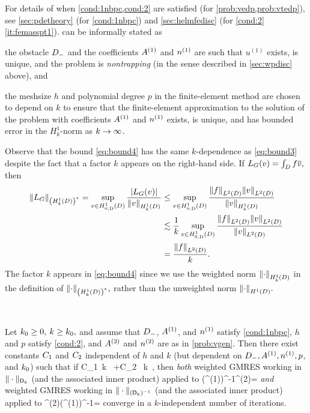 For details of when \cref{cond:1nbpc,cond:2} are satisfied (for \cref{prob:vedp,prob:vtedp}), see \cref{sec:pdetheory} (for \cref{cond:1nbpc}) and \cref{sec:helmfedisc} (for \cref{cond:2} \cref{it:femasspt1}).  can be informally stated as 
\bit
\item the obstacle $D_{-}$ and the coefficients ${A}^{(1)}$ and ${n}^{(1)}$ are such that $u^{(1)}$ exists, is unique, and the problem is \emph{nontrapping} (in the sense described in  \cref{sec:wpdisc} above), and
\item the meshsize $h$ and polynomial degree $p$ in the finite-element method are chosen to depend on $k$ to ensure that the 
finite-element approximation to the solution of the problem with coefficients ${A}^{(1)}$ and ${n}^{(1)}$ exists, is unique, and has bounded error in the $H^1_k$-norm as
$k\rightarrow \infty$. 
\eit 


\label{rem:yesitis}
Observe that the bound \cref{eq:bound4} has the same $k$-dependence as \cref{eq:bound3} despite the fact that a factor $k$ appears on the right-hand side. If $L_{G}(v) = \int_{D} f\overline{v},$ then
\begin{align*}
  \NHokDs{\LG} = \sup_{v \in \HozDD} \frac{\abs{\LG(v)}}{\NHokD{v}} &\leq\sup_{v \in \HozDD} \frac{\NLtD{f}\NLtD{v}}{\NHokD{v}}\\
  &\lesssim \frac1k \sup_{v \in \HozDD} \frac{\NLtD{f}\NLtD{v}}{\NLtD{v}}\\
  &= \frac{\NLtD{f}}k.
\end{align*}
The factor $k$ appears in \cref{eq:bound4} since we use the weighted norm $\NHokD{\cdot}$ in the definition of $\NHokDs{\cdot},$ rather than the unweighted norm $\NHoD{\cdot}.$
\ere

\label{cor:1}

\

\noindent Let $k_{0} \geq 0,$ $k \geq k_{0},$ and assume that $D_{-}$, ${A}^{(1)}$, and ${n}^{(1)}$ satisfy \cref{cond:1nbpc}, $h$ and $p$ satisfy \cref{cond:2}, and ${A}^{(2)}$ and ${n}^{(2)}$ are as in \cref{prob:vgen}. Then there exist constants $C_{1}$ and $C_{2}$  independent of $h$ and $k$ (but dependent on $D_{-}, {A}^{(1)}, {n}^{(1)}, p$, and $k_{0}$) such that if 
\beq\label{eq:cond}
C_1 \,k \,\NLiDop{\Aso-\Ast} +C_2 \, k\, \NLiDRR{\nso-\nst}
\leq {},
\eeq
then \emph{both} weighted GMRES working in $\|\cdot\|_{\mathsf{D}_k}$ (and the associated inner product) applied to 
\beq\label{eq:pcsystem1}
(\Amat^{(1)})^{-1}\Amat^{(2)}\uvec = \fvec
\eeq
\emph{and} weighted GMRES working in $\|\cdot\|_{(\mathsf{D}_k)^{-1}}$ (and the associated inner product) applied to 
\beq\label{eq:pcsystem2}
\Amat^{(2)}(\Amat^{(1)})^{-1}\vvec = \fvec
\eeq
 converge in a $k$-independent number of iterations.
 \enth

